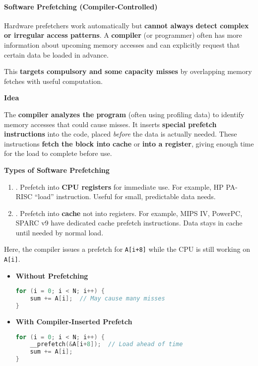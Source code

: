 \paragraph{Software Prefetching (Compiler-Controlled)}\label{paragraph: Software Prefetching}

Hardware prefetchers work automatically but \textbf{cannot always detect complex or irregular access patterns}. A \textbf{compiler} (or programmer) often has more information about upcoming memory accesses and can explicitly request that certain data be loaded in advance.

\highspace
This \textbf{targets compulsory and some capacity misses} by overlapping memory fetches with useful computation.

\highspace
\begin{flushleft}
    \textcolor{Green3}{ \textbf{Idea}}
\end{flushleft}
The \textbf{compiler analyzes the program} (often using profiling data) to identify memory accesses that could cause misses. It inserts \textbf{special prefetch instructions} into the code, placed \emph{before} the data is actually needed. These instructions \textbf{fetch the block into cache} or \textbf{into a register}, giving enough time for the load to complete before use.

\highspace
\begin{flushleft}
    \textcolor{Green3}{ \textbf{Types of Software Prefetching}}
\end{flushleft}
\begin{enumerate}
    \item {}. Prefetch into \textbf{CPU registers} for immediate use. For example, HP PA-RISC ``load'' instruction. Useful for small, predictable data needs.
    \item {}. Prefetch into \textbf{cache} not into registers. For example, MIPS IV, PowerPC, SPARC v9 have dedicated cache prefetch instructions. Data stays in cache until needed by normal load.
\end{enumerate}
\begin{examplebox}
    Here, the compiler issues a prefetch for \texttt{A[i+8]} while the CPU is still working on \texttt{A[i]}.
    \begin{itemize}
        \item \textbf{Without Prefetching}
        \begin{lstlisting}[language=c]
for (i = 0; i < N; i++) {
    sum += A[i];  // May cause many misses
}\end{lstlisting}
        \item \textbf{With Compiler-Inserted Prefetch}
        \begin{lstlisting}[language=c]
for (i = 0; i < N; i++) {
    __prefetch(&A[i+8]);  // Load ahead of time
    sum += A[i];
}\end{lstlisting}
    \end{itemize}
\end{examplebox}

